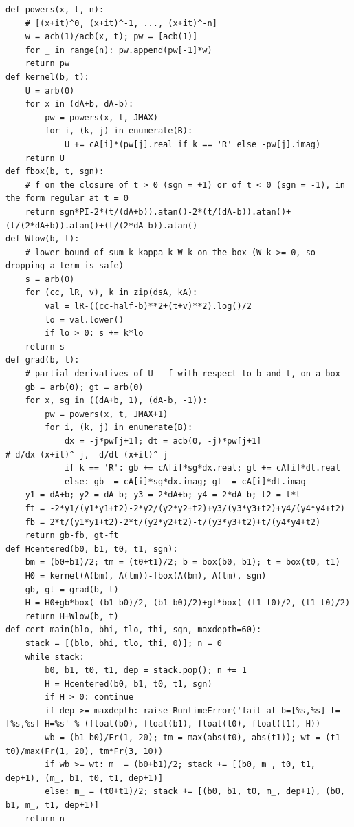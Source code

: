 \documentclass[11pt,reqno]{amsart}
\numberwithin{equation}{section}
\theoremstyle{definition}
\theoremstyle{remark}
\begin{document}
\begin{lstlisting}
def powers(x, t, n):
    # [(x+it)^0, (x+it)^-1, ..., (x+it)^-n]
    w = acb(1)/acb(x, t); pw = [acb(1)]
    for _ in range(n): pw.append(pw[-1]*w)
    return pw
def kernel(b, t):
    U = arb(0)
    for x in (dA+b, dA-b):
        pw = powers(x, t, JMAX)
        for i, (k, j) in enumerate(B):
            U += cA[i]*(pw[j].real if k == 'R' else -pw[j].imag)
    return U
def fbox(b, t, sgn):
    # f on the closure of t > 0 (sgn = +1) or of t < 0 (sgn = -1), in the form regular at t = 0
    return sgn*PI-2*(t/(dA+b)).atan()-2*(t/(dA-b)).atan()+(t/(2*dA+b)).atan()+(t/(2*dA-b)).atan()
def Wlow(b, t):
    # lower bound of sum_k kappa_k W_k on the box (W_k >= 0, so dropping a term is safe)
    s = arb(0)
    for (cc, lR, v), k in zip(dsA, kA):
        val = lR-((cc-half-b)**2+(t+v)**2).log()/2
        lo = val.lower()
        if lo > 0: s += k*lo
    return s
def grad(b, t):
    # partial derivatives of U - f with respect to b and t, on a box
    gb = arb(0); gt = arb(0)
    for x, sg in ((dA+b, 1), (dA-b, -1)):
        pw = powers(x, t, JMAX+1)
        for i, (k, j) in enumerate(B):
            dx = -j*pw[j+1]; dt = acb(0, -j)*pw[j+1]                      # d/dx (x+it)^-j,  d/dt (x+it)^-j
            if k == 'R': gb += cA[i]*sg*dx.real; gt += cA[i]*dt.real
            else: gb -= cA[i]*sg*dx.imag; gt -= cA[i]*dt.imag
    y1 = dA+b; y2 = dA-b; y3 = 2*dA+b; y4 = 2*dA-b; t2 = t*t
    ft = -2*y1/(y1*y1+t2)-2*y2/(y2*y2+t2)+y3/(y3*y3+t2)+y4/(y4*y4+t2)
    fb = 2*t/(y1*y1+t2)-2*t/(y2*y2+t2)-t/(y3*y3+t2)+t/(y4*y4+t2)
    return gb-fb, gt-ft
def Hcentered(b0, b1, t0, t1, sgn):
    bm = (b0+b1)/2; tm = (t0+t1)/2; b = box(b0, b1); t = box(t0, t1)
    H0 = kernel(A(bm), A(tm))-fbox(A(bm), A(tm), sgn)
    gb, gt = grad(b, t)
    H = H0+gb*box(-(b1-b0)/2, (b1-b0)/2)+gt*box(-(t1-t0)/2, (t1-t0)/2)
    return H+Wlow(b, t)
def cert_main(blo, bhi, tlo, thi, sgn, maxdepth=60):
    stack = [(blo, bhi, tlo, thi, 0)]; n = 0
    while stack:
        b0, b1, t0, t1, dep = stack.pop(); n += 1
        H = Hcentered(b0, b1, t0, t1, sgn)
        if H > 0: continue
        if dep >= maxdepth: raise RuntimeError('fail at b=[%s,%s] t=[%s,%s] H=%s' % (float(b0), float(b1), float(t0), float(t1), H))
        wb = (b1-b0)/Fr(1, 20); tm = max(abs(t0), abs(t1)); wt = (t1-t0)/max(Fr(1, 20), tm*Fr(3, 10))
        if wb >= wt: m_ = (b0+b1)/2; stack += [(b0, m_, t0, t1, dep+1), (m_, b1, t0, t1, dep+1)]
        else: m_ = (t0+t1)/2; stack += [(b0, b1, t0, m_, dep+1), (b0, b1, m_, t1, dep+1)]
    return n


\end{lstlisting}
\end{document}
